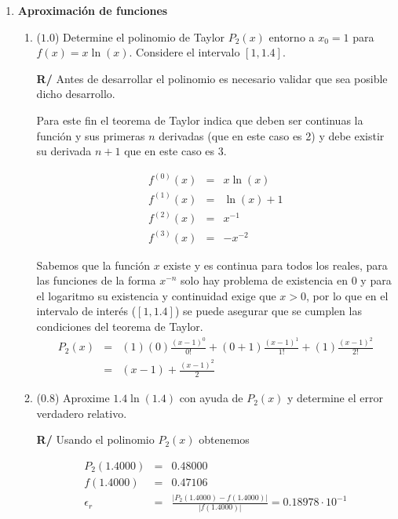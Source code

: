\documentclass[12pt]{article}
\begin{document}
  \begin{enumerate}[leftmargin=*,widest=9]
    \item \textbf{Aproximación de funciones}
    \begin{enumerate}[label=\alph*]
    \item (\(1.0\)) Determine el polinomio de Taylor \(P_2(x)\) entorno a \(x_0=1\) para \(f(x) = x \ln(x) \). Considere el intervalo \([1, 1.4]\).
    
   
   \textbf{R/} Antes de desarrollar el polinomio es necesario validar que sea posible dicho desarrollo.
   
   Para este fin el teorema de Taylor indica que deben ser continuas la función y sus primeras \(n\) derivadas (que en este caso es 2) y debe existir su derivada \(n+1\) que en este caso es 3.
   
   \begin{eqnarray*}
   f^{(0)}(x) &=& x \ln(x) \\
   f^{(1)}(x) &=& \ln(x) + 1 \\
   f^{(2)}(x) &=& x^{-1} \\
   f^{(3)}(x) &=& -x^{-2}
   \end{eqnarray*}
   
   Sabemos que la función \(x\) existe y es continua para todos los reales, para las funciones de la forma \(x^{-n}\) solo hay problema de existencia en \(0\) y para el logaritmo su existencia y continuidad exige que \(x>0\), por lo que en el intervalo de interés (\([1, 1.4]\)) se puede asegurar que se cumplen las condiciones del teorema de Taylor.
\begin{eqnarray*}
P_2(x) & = & (1)(0) \frac{(x-1)^0}{0!} + (0 + 1) \frac{(x-1)^1}{1!} + (1) \frac{(x-1)^2}{2!} \\
& = & (x - 1) + \frac{(x - 1)^2}{2}
\end{eqnarray*}
    \item (\(0.8\)) Aproxime \(1.4 \ln(1.4)\) con ayuda de \(P_2(x)\) y determine el error verdadero relativo.
    
   \textbf{R/} Usando el polinomio \(P_2(x)\) obtenemos
   
   \begin{eqnarray*}
   P_2(1.4000) & = & 0.48000 \\
   f(1.4000) & = & 0.47106 \\
   \epsilon_r & = & \frac{| P_2(1.4000) - f(1.4000) |}{|f(1.4000)|} = 0.18978 \cdot 10^{-1}
\end{eqnarray*}      
   

\end{enumerate}
\end{enumerate}
\end{document}
